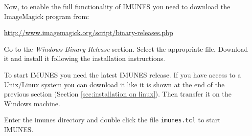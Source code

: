 Now, to enable the full functionality of IMUNES you need to download the
ImageMagick program from:

\begin{center}
\url{http://www.imagemagick.org/script/binary-releases.php}
\end{center}

Go to the \emph{Windows Binary Release} section. Select the appropriate file.
Download it and install it following the installation instructions.

To start IMUNES you need the latest IMUNES release. If you have access to a
Unix/Linux system you can download it like it is shown at the end of the
previous section (Section \ref{sec:installation on linux}). Then transfer it on
the Windows machine.

Enter the imunes directory and double click the file \texttt{imunes.tcl} to
start IMUNES.
